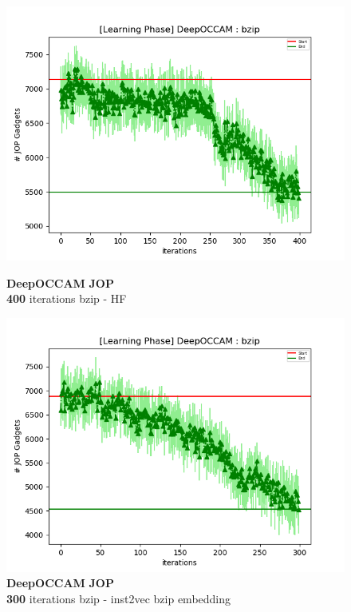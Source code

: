 \documentclass{relatorio}
\begin{document}
\begin{figure}[H]
	\centering
	\captionsetup{justification=centering}
	\includegraphics[width=1\linewidth]{imgs/plots/deepoccam_HF_bzip_JOP_plot.png}
	\caption{\textbf{DeepOCCAM} \textbf{JOP} \\ \textbf{400} iterations \color{blue} bzip - HF}%
	\label{fig:plant}
	\centering
	\captionsetup{justification=centering}
	\includegraphics[width=1\linewidth]{imgs/plots/deepoccam_inst2vec_bzip_JOP_plot.png}
	\caption{\textbf{DeepOCCAM} \textbf{JOP} \\ \textbf{300} iterations \color{blue} bzip - inst2vec bzip embedding}%
	\label{fig:plant}
	\centering
	\captionsetup{justification=centering}

\end{figure}
\end{document}
